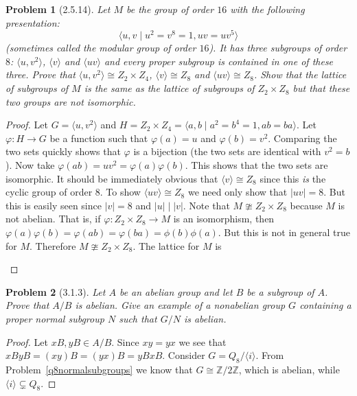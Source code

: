 \documentclass{article}
\newtheorem{problem}{Problem}
\begin{document}
\begin{problem}[2.5.14]
Let $M$ be the group of order $16$ with the following presentation:
\[
\langle u, v \mid u^2 = v^8 = 1, uv = uv^5 \rangle
\]
(sometimes called the \emph{modular} group of order $16$). It has three subgroups of order $8$: $\langle u, v^2 \rangle$, $\langle v \rangle$ and $\langle uv \rangle$ and every proper subgroup is contained in one of these three. Prove that $\langle u, v^2 \rangle \cong Z_2 \times Z_4$, $\langle v \rangle \cong Z_8$ and $\langle uv \rangle \cong Z_8$. Show that the lattice of subgroups of $M$ is the same as the lattice of subgroups of $Z_2 \times Z_8$ but that these two groups are not isomorphic.
\end{problem}
\begin{proof}
Let $G = \langle u, v^2 \rangle$ and $H = Z_2 \times Z_4 = \langle a,b \mid a^2 = b^4 = 1, ab = ba \rangle$. Let $\varphi : H \to G$ be a function such that $\varphi(a) = u$ and $\varphi(b) = v^2$. Comparing the two sets quickly shows that $\varphi$ is a bijection (the two sets are identical with $v^2 = b$). Now take $\varphi(ab) = uv^2 = \varphi(a)\varphi(b)$. This shows that the two sets are isomorphic. It should be immediately obvious that $\langle v \rangle \cong Z_8$ since this \emph{is} the cyclic group of order $8$. To show $\langle uv \rangle \cong Z_8$ we need only show that $|uv| = 8$. But this is easily seen since $|v| = 8$ and $|u| \mid |v|$. Note that $M \ncong Z_2 \times Z_8$ because $M$ is not abelian. That is, if $\varphi : Z_2 \times Z_8 \to M$ is an isomorphism, then $\varphi(a) \varphi(b) = \varphi (ab) = \varphi(ba) = \phi(b)\phi(a)$. But this is not in general true for $M$. Therefore $M \ncong Z_2 \times Z_8$. The lattice for $M$ is

\centerline{
}
\end{proof}

\begin{problem}[3.1.3]
Let $A$ be an abelian group and let $B$ be a subgroup of $A$. Prove that $A/B$ is abelian. Give an example of a nonabelian group $G$ containing a proper normal subgroup $N$ such that $G/N$ is abelian.
\end{problem}
\begin{proof}
Let $xB, yB \in A/B$. Since $xy = yx$ we see that $xByB = (xy)B = (yx)B = yBxB$. Consider $G = Q_8/\langle i \rangle$. From Problem~\ref{q8normalsubgroups} we know that $G \cong \mathbb{Z}/2\mathbb{Z}$, which is abelian, while $\langle i \rangle \subsetneq Q_8$.
\end{proof}
\end{document}
